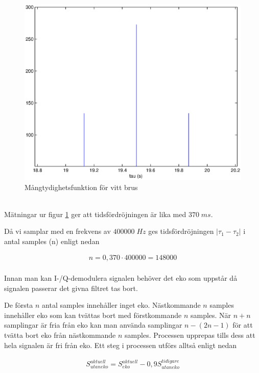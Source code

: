 \documentclass[10pt]{article}
\begin{document}
\begin{figure}[htp]
  \begin{center}
  \includegraphics[keepaspectratio=true,width=\linewidth]{xCorr.eps}  %
  \end{center}
  \caption{Mångtydighetsfunktion för vitt brus} %
  \label{fig:xCorr}
\end{figure}
~\\
Mätningar ur figur \ref{fig:xCorr} ger att tidsfördröjningen är lika med $370\;ms$. 

Då vi samplar med en frekvens av $400 000\;Hz$ ges tidsfördröjningen $|\tau_1 - \tau_2|$ i antal samples (n) enligt nedan 

\begin{gather}
n = 0,370 \cdot 400 000 = 148 000
\label{equ:delaySamples}
\end{gather}
~\\
Innan man kan I-/Q-demodulera signalen behöver det eko som uppstår då signalen passerar det givna filtret tas bort. 

De första $n$ antal samples innehåller inget eko. Nästkommande $n$ samples innehåller eko som kan tvättas bort med förstkommande $n$ samples. När $n+n$ samplingar är fria från eko kan man använda samplingar $n-(2n-1)$ för att tvätta bort eko från nästkommande $n$ samples. Processen upprepas tills dess att hela signalen är fri från eko. Ett steg i processen utförs alltså enligt nedan

\begin{gather}
S_{utan eko}^{aktuell} = S_{eko}^{aktuell} - 0,9S_{utan eko}^{tidigare}
\label{equ:eko}
\end{gather}
\end{document}
